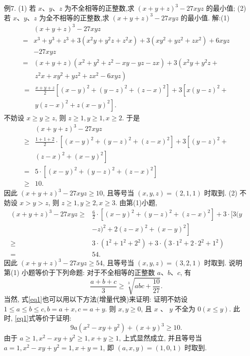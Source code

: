 例7. (1) 若 $x 、 y 、 z$ 为不全相等的正整数,求 $(x+y+z)^3-27 x y z$ 的最小值;
(2) 若 $x 、 y 、 z$ 为全不相等的正整数,求 $(x+y+z)^3-27 x y z$ 的最小值.
解:(1)
$$
\begin{aligned}
& (x+y+z)^3-27 x y z \\
= & x^3+y^3+z^3+3\left(x^2 y+y^2 z+z^2 x\right)+3\left(x y^2+y z^2+z x^2\right)+6 x y z \\
& -27 x y z \\
= & (x+y+z)\left(x^2+y^2+z^2-x y-y z-z x\right)+3\left(x^2 y+y^2 z+\right.
\end{aligned}
$$
$$
\begin{aligned}
& \left.z^2 x+x y^2+y z^2+z x^2-6 x y z\right) \\
= & \frac{x+y+z}{2}\left[(x-y)^2+(y-z)^2+(z-x)^2\right]+3\left[x(y-z)^2+\right. \\
& \left.y(z-x)^2+z(x-y)^2\right] .
\end{aligned}
$$
不妨设 $x \geqslant y \geqslant z$, 则 $z \geqslant 1, y \geqslant 1, x \geqslant 2$.
于是
$$
\begin{aligned}
& (x+y+z)^3-27 x y z \\
\geqslant & \frac{1+1+2}{2} \cdot\left[(x-y)^2+(y-z)^2+(z-x)^2\right]+3\left[(y-z)^2+\right. \\
& \left.(z-x)^2+(x-y)^2\right] \\
= & 5 \cdot\left[(x-y)^2+(y-z)^2+(z-x)^2\right] \\
\geqslant & 10 .
\end{aligned}
$$
因此 $(x+y+z)^3-27 x y z \geqslant 10$, 且等号当 $(x, y, z)=(2,1,1)$ 时取到.
(2) 不妨设 $x>y>z$, 则 $z \geqslant 1, y \geqslant 2, x \geqslant 3$.
由第(1)小题,
$$
\begin{aligned}
(x+y+z)^3-27 x y z \geqslant & \frac{6}{2} \cdot\left[(x-y)^2+(y-z)^2+(z-x)^2\right]+3 \cdot[3(y \\
& \left.-z)^2+2(z-x)^2+(x-y)^2\right] \\
\geqslant & 3 \cdot\left(1^2+1^2+2^2\right)+3 \cdot\left(3 \cdot 1^2+2 \cdot 2^2+1^2\right) \\
= & 54 .
\end{aligned}
$$
因此 $(x+y+z)^3-27 x y z \geqslant 54$, 且等号当 $(x, y, z)=(3,2,1)$ 时取到.
说明第(1) 小题等价于下列命题:
对于不全相等的正整数 $a 、 b 、 c$, 有
$$
\frac{a+b+c}{3} \geqslant \sqrt[3]{a b c+\frac{10}{27}} . \label{eq1}
$$
当然, 式\ref{eq1}也可以用以下方法(增量代换)来证明:
证明不妨设 $1 \leqslant a \leqslant b \leqslant c, b=a+x, c=a+y$. 则 $x, y \geqslant 0$, 且 $x$ 、 $y$ 不全为 $0(x \leqslant y)$.
此时, \ref{eq1}式等价于证明:
$$
9 a\left(x^2-x y+y^2\right)+(x+y)^3 \geqslant 10 .
$$
由于 $a \geqslant 1, x^2-x y+y^2 \geqslant 1, x+y \geqslant 1$, 上式显然成立, 并且等号当 $a=1, x^2-x y+y^2=1, x+y=1$, 即 $(a, x, y)=(1,0,1)$ 时取到.




